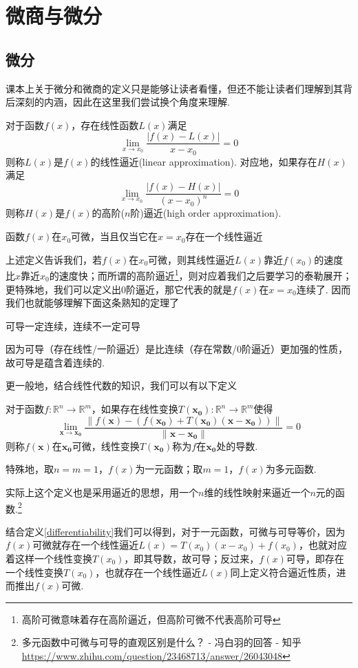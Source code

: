 \section{微商与微分}
\subsection{微分}
课本上关于微分和微商的定义只是能够让读者看懂，但还不能让读者们理解到其背后深刻的内涵，因此在这里我们尝试换个角度来理解.
\begin{definition}
对于函数$f(x)$，存在线性函数$L(x)$满足
\[\lim_{x\to x_0}\frac{|f(x)-L(x)|}{x-x_0}=0\]
则称$L(x)$是$f(x)$的线性逼近(linear approximation).
对应地，如果存在$H(x)$满足
\[\lim_{x\to x_0}\frac{|f(x)-H(x)|}{(x-x_0)^n}=0\]
则称$H(x)$是$f(x)$的高阶($n$阶)逼近(high order approximation).
\end{definition}
\begin{definition}[可微性]
\label{differentiability}
函数$f(x)$在$x_0$可微，当且仅当它在$x=x_0$存在一个线性逼近
\end{definition}
上述定义告诉我们，若$f(x)$在$x_0$可微，则其线性逼近$L(x)$靠近$f(x_0)$的速度比$x$靠近$x_0$的速度快；而所谓的高阶逼近\footnote{高阶可微意味着存在高阶逼近，但高阶可微不代表高阶可导}，则对应着我们之后要学习的泰勒展开；更特殊地，我们可以定义出$0$阶逼近，那它代表的就是$f(x)$在$x=x_0$连续了. 因而我们也就能够理解下面这条熟知的定理了
\begin{theorem}
可导一定连续，连续不一定可导
\end{theorem}
因为可导（存在线性/一阶逼近）是比连续（存在常数/$0$阶逼近）更加强的性质，故可导是蕴含着连续的.
\par 更一般地，结合线性代数的知识，我们可以有以下定义
\begin{definition}
对于函数$f:\mathbb{R}^n\to\mathbb{R}^m$，如果存在线性变换$T(\mathbf{x_0}):\mathbb{R}^n\to\mathbb{R}^m$使得
\[\lim_{\mathbf{x}\to \mathbf{x_0}}\frac{\|f(\mathbf{x})-(f(\mathbf{x_0})+T(\mathbf{x_0})(\mathbf{x}-\mathbf{x_0}))\|}{\|\mathbf{x}-\mathbf{x_0}\|}=0\]
则称$f(\mathbf{x})$在$\mathbf{x_0}$可微，线性变换$T(\mathbf{x_0})$称为$f$在$\mathbf{x_0}$处的导数.
\par 特殊地，取$n=m=1$，$f(x)$为一元函数；取$m=1$，$f(x)$为多元函数.
\end{definition}
实际上这个定义也是采用逼近的思想，用一个$n$维的线性映射来逼近一个$n$元的函数.\footnote{多元函数中可微与可导的直观区别是什么？ - 冯白羽的回答 - 知乎 \url{https://www.zhihu.com/question/23468713/answer/26043048}}
\par 结合定义\ref{differentiability}我们可以得到，对于一元函数，可微与可导等价，因为$f(x)$可微就存在一个线性逼近$L(x)=T(x_0)(x-x_0)+f(x_0)$，也就对应着这样一个线性变换$T(x_0)$，即其导数，故可导；反过来，$f(x)$可导，即存在一个线性变换$T(x_0)$，也就存在一个线性逼近$L(x)$同上定义符合逼近性质，进而推出$f(x)$可微.
